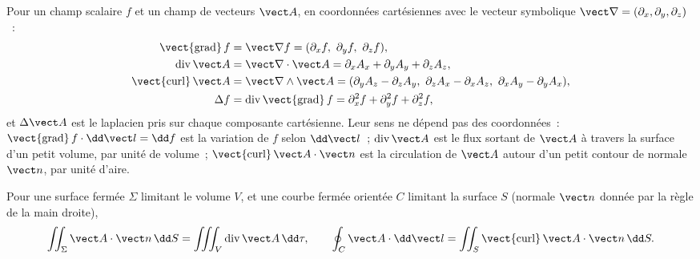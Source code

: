 \begin{definition}\label{def:b2:maxwell-equations:operators}
Pour un champ scalaire $f$ et un champ de vecteurs $\vect A$, en coordonnées
cartésiennes avec le vecteur symbolique $\vect\nabla = (\partial_x, \partial_y,
\partial_z)$~:
\begin{align*}
\operatorname{\vect{grad}}f &= \vect\nabla f = (\partial_xf,\ \partial_yf,\ \partial_zf) ,\\
\operatorname{div}\vect A &= \vect\nabla\cdot\vect A = \partial_xA_x + \partial_yA_y + \partial_zA_z ,\\
\operatorname{\vect{curl}}\vect A &= \vect\nabla\wedge\vect A = (\partial_yA_z - \partial_zA_y,\ \partial_zA_x - \partial_xA_z,\ \partial_xA_y - \partial_yA_x) ,\\
\Delta f &= \operatorname{div}\operatorname{\vect{grad}}f = \partial_x^2f + \partial_y^2f + \partial_z^2f ,
\end{align*}
et $\Delta\vect A$ est le laplacien pris sur chaque composante cartésienne.
Leur sens ne dépend pas des coordonnées~: $\operatorname{\vect{grad}}f
\cdot\dd\vect l = \dd f$ est la variation de $f$ selon $\dd\vect l$~; $\operatorname{div}
\vect A$ est le flux sortant de $\vect A$ à travers la surface d'un petit
volume, par unité de volume~; $\operatorname{\vect{curl}}\vect A\cdot\vect n$ est la
circulation de $\vect A$ autour d'un petit contour de normale $\vect n$, par unité
d'aire.
\end{definition}

\begin{theorem}\label{thm:b2:maxwell-equations:theorems}
Pour une surface fermée $\Sigma$ limitant le volume $V$, et une courbe fermée
orientée $C$ limitant la surface $S$ (normale $\vect n$ donnée par la
règle de la main droite),
\[
\iint_\Sigma\vect A\cdot\vect n\,\dd S = \iiint_V\operatorname{div}\vect A\,\dd\tau ,
\qquad
\oint_C\vect A\cdot\dd\vect l = \iint_S\operatorname{\vect{curl}}\vect A\cdot\vect n\,\dd S .
\]
\end{theorem}
\admitted

